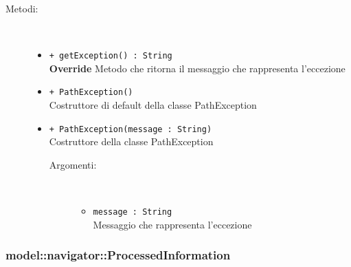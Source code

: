 \documentclass[../DefinizioneDiProdotto.tex]{subfiles}
\begin{document}
\begin{description}
\begin{itemize}
\end{itemize}
\item[Metodi:] \
\begin{itemize}
\item \texttt{+ getException() : String}\\
\textbf{Override} Metodo che ritorna il messaggio che rappresenta l'eccezione
 \item \texttt{+ PathException()}\\
Costruttore di default della classe PathException
 \item \texttt{+ PathException(message : String)}\\
Costruttore della classe PathException
 \begin{description}
\item[Argomenti:] \
\begin{itemize}
\item \texttt{message : String}\\
Messaggio che rappresenta l'eccezione\end{itemize}
\end{description}
\end{itemize}
\end{description}

\subsubsection{model::navigator::ProcessedInformation}
\end{document}
